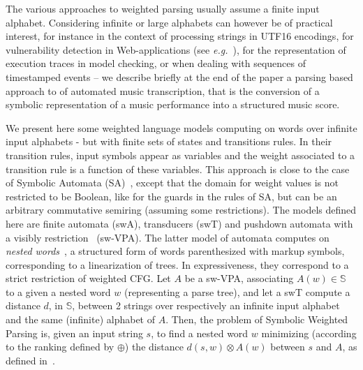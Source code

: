 \documentclass[runningheads]{llncs}
\def\eg{\textit{e.g.}\xspace}
\newcommand{\Semiring}{\mathbb{S}}
\def\SWT{\textsf{swT}\xspace}
\def\SWA{\textsf{swA}\xspace}
\def\SWVPA{\textsf{sw-VPA}\xspace}
\begin{document}
The various approaches to weighted parsing usually assume a finite input alphabet. %
Considering infinite or large alphabets can however be of practical interest, 
for instance in the context of processing strings in UTF16 encodings, 
for vulnerability detection in Web-applications 
(see \eg~\cite{dAntoni21CACM}), 
for the representation of execution traces in model checking, 
or when dealing with sequences of timestamped events
-- we describe briefly at the end of the paper a parsing based approach to 
of automated music transcription, that is the conversion of a symbolic 
representation of a music performance into a structured music score.

We present here some weighted language models
computing on words over infinite input alphabets %
- but with finite sets of states and transitions rules. 
In their transition rules, input symbols appear as variables %
and the weight associated to a transition rule is a function of these variables.
% 
This approach is close to the case of 
Symbolic Automata (SA)~\cite{dAntoniVeanes17CAV,dAntoni21CACM}, 
except that the domain for weight values is not restricted to be Boolean, 
like for the guards in the rules of SA, 
but can be an arbitrary commutative semiring (assuming some restrictions).
%
The models defined here are finite automata (\SWA),
transducers (\SWT) and pushdown automata
with a visibly restriction~\cite{AlurMadhusudan09nested} (\SWVPA).
The latter model of automata computes on \emph{nested words}~\cite{AlurMadhusudan09nested}, 
a structured form of words parenthesized with markup symbols, 
corresponding to a linearization of trees.
In expressiveness, they correspond to a strict restriction
of weighted CFG. 
Let $A$ be a \SWVPA, associating $A(w) \in \Semiring$ 
to a given a nested word $w$ (representing a parse tree),
and let a \SWT compute a distance $d$, in $\Semiring$, 
between 2 strings over respectively an infinite input alphabet and the 
same (infinite) alphabet of $A$.
Then, the problem of Symbolic Weighted Parsing is, 
given an input string $s$, to find a nested word $w$ minimizing 
(according to the ranking defined by $\oplus$)
the distance $d(s, w) \otimes A(w)$ between $s$ and $A$, 
as defined in~\cite{Mohri03EDWA}.
\end{document}
